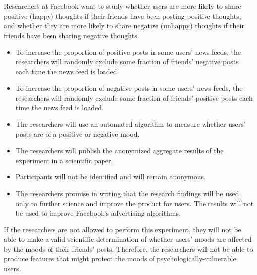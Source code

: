 Researchers at Facebook want to study whether users are more likely to share positive (happy) thoughts if their friends have been posting positive thoughts, and whether they are more likely to share negative (unhappy) thoughts if their friends have been sharing negative thoughts.
\begin{itemize}
\item To increase the proportion of positive posts in some users' news feeds, the researchers will randomly exclude some fraction of friends' negative posts each time the news feed is loaded.
\item To increase the proportion of negative posts in some users' news feeds, the researchers will randomly exclude some fraction of friends' positive posts each time the news feed is loaded.
\item The researchers will use an automated algorithm to measure whether users' posts are of a positive or negative mood.
\item The researchers will publish the anonymized aggregate results of the experiment in a scientific paper.
\item Participants will not be identified and will remain anonymous.
\item The researchers promise in writing that the research findings will be used only to further science and improve the product for users. The results will not be used to improve Facebook's advertising algorithms.
\end{itemize}
If the researchers are not allowed to perform this experiment, they will not be able to make a valid scientific determination of whether users' moods are affected by the moods of their friends' posts. Therefore, the researchers will not be able to produce features that might protect the moods of psychologically-vulnerable users.
